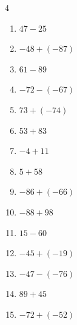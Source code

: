 \begin{multicols}{4}
\begin{enumerate}
        \phantom{$=50$}

  \item $47-25$

        \phantom{$=22$}

  \item $-48+(-87)$

        \phantom{$=-135$}

  \item $61-89$

        \phantom{$=-28$}

  \item $-72-(-67)$

        \phantom{$=-5$}

  \item $73+(-74)$

        \phantom{$=-1$}

  \item $53+83$

        \phantom{$=136$}

  \item $-4+11$

        \phantom{$=7$}

  \item $5+58$

        \phantom{$=63$}

  \item $-86+(-66)$

        \phantom{$=-152$}

  \item $-88+98$

        \phantom{$=10$}

  \item $15-60$

        \phantom{$=-45$}

  \item $-45+(-19)$

        \phantom{$=-64$}

  \item $-47-(-76)$

        \phantom{$=29$}

  \item $89+45$

        \phantom{$=134$}

\columnbreak %

\resetques

  \item $-72+(-52)$

        \phantom{$=-124$}


\end{enumerate}
\end{multicols}
